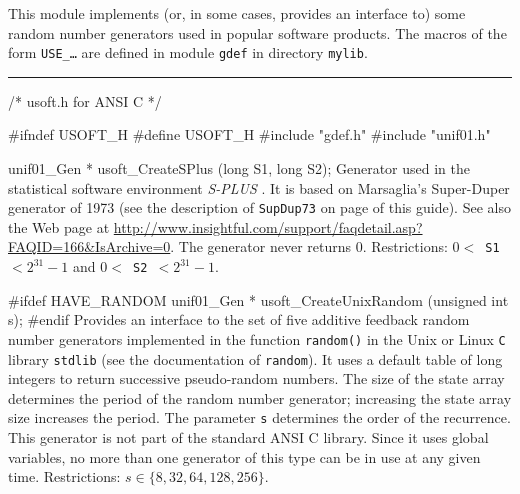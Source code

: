 
This module implements (or, in some cases, provides an interface to)
some random number generators used in popular software products.
The macros of the form {\tt USE\_\ldots} are defined in module 
{\tt gdef} in directory {\tt mylib}.

\bigskip
\hrule
\code
\hide
/* usoft.h for ANSI C */

#ifndef USOFT_H
#define USOFT_H
\endhide
#include "gdef.h"
#include "unif01.h"


unif01_Gen * usoft_CreateSPlus (long S1, long S2);
\endcode
  \tab Generator used in the statistical software environment  
%
    {\em S-PLUS\/} \cite{tRIP94a,tSPL00a}. It is based on Marsaglia's Super-Duper
   generator of 1973 (see the description of \texttt{SupDup73} on page
  \pageref{gen:SupDup73} of this guide). See also the Web page at
  \url{http://www.insightful.com/support/faqdetail.asp?FAQID=166&IsArchive=0}.
   The generator never returns 0.
   Restrictions: {\tt $0 <$ S1 $< 2^{31}-1$} and {\tt $0 <$ S2 $< 2^{31}-1$}.
  \endtab
\code


#ifdef HAVE_RANDOM
   unif01_Gen * usoft_CreateUnixRandom (unsigned int s);
#endif
\endcode
  \tab 
  Provides an interface to the set of five additive feedback 
   random number generators implemented in the function {\tt random()} 
   in the Unix or Linux {\tt C} library {\tt stdlib}
%
   (see the documentation of {\tt random}).
   It uses a default table of
      long integers to return successive  pseudo-random  numbers.
      The size  of  the  state  array  determines  the  period  of the
     random number generator; increasing  the  state  array  size
     increases the period.
  The parameter {\tt s} determines the order of the recurrence.
  This generator is not part of the standard ANSI C library.
  Since it uses global variables, no more than one generator
  of this type can be in use at any given time. 
  Restrictions: $s \in \{8, 32, 64, 128, 256\}$. 
 \endtab
\code


